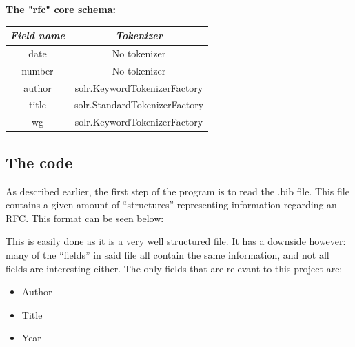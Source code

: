\documentclass[a4paper,english]{report}
\begin{document}
\textbf{The "rfc" core schema:}
\begin{center}
 \begin{tabular}{||c | c||} 
 \hline
 \textit{Field name} & \textit{Tokenizer} \\ [1ex] 
 \hline\hline


date & No tokenizer\\

\hline


number & No tokenizer\\

\hline


author & solr.KeywordTokenizerFactory\\

\hline



title & solr.StandardTokenizerFactory\\

\hline


wg & solr.KeywordTokenizerFactory\\

\hline


\end{tabular}
\end{center}


\subsection{The code}

As described earlier, the first step of the program is to read the .bib file. 
This file contains a given amount of “structures” representing information regarding an RFC. This format can be seen below:







This is easily done as it is a very well structured file. It has a downside however: many of the “fields” in said file all contain the same information, and not all fields are interesting either.
The only fields that are relevant to this project are:

\begin{itemize}

\item Author
\item Title
\item Year

\end{itemize}
\end{document}
